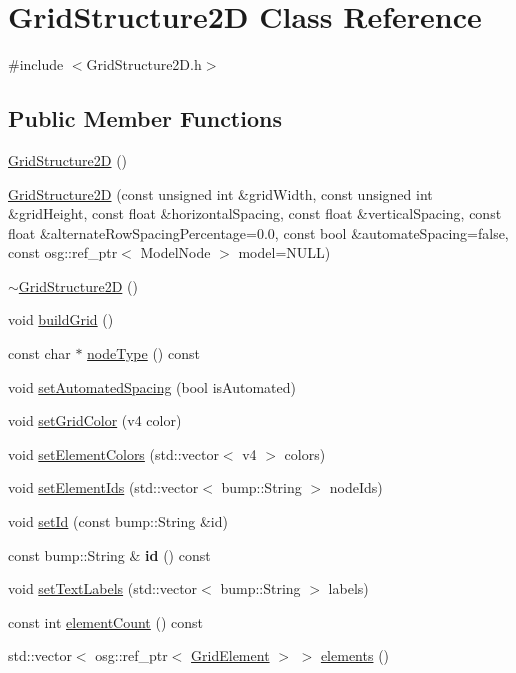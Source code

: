 \hypertarget{class_grid_structure2_d}{
\section{GridStructure2D Class Reference}
\label{class_grid_structure2_d}
}


{\ttfamily \#include $<$GridStructure2D.h$>$}\subsection*{Public Member Functions}
\begin{DoxyCompactItemize}
\item 
\hyperlink{class_grid_structure2_d_ad7665e25b03615d26437a6d2d7a6ab13}{GridStructure2D} ()
\item 
\hyperlink{class_grid_structure2_d_a6e85d262f6e5c6a8be7aad82e4c0eb8b}{GridStructure2D} (const unsigned int \&gridWidth, const unsigned int \&gridHeight, const float \&horizontalSpacing, const float \&verticalSpacing, const float \&alternateRowSpacingPercentage=0.0, const bool \&automateSpacing=false, const osg::ref\_\-ptr$<$ ModelNode $>$ model=NULL)
\item 
\hyperlink{class_grid_structure2_d_a90ac22e05a7e1bf2737d3fa51d158b61}{$\sim$GridStructure2D} ()
\item 
void \hyperlink{class_grid_structure2_d_a35f694a9b0e064bfaebff7c382ba2ecb}{buildGrid} ()
\item 
const char $\ast$ \hyperlink{class_grid_structure2_d_af994372e96543559c040b40bb6969bfa}{nodeType} () const 
\item 
void \hyperlink{class_grid_structure2_d_acbf816d7cb1750c2084c09db385f2db3}{setAutomatedSpacing} (bool isAutomated)
\item 
void \hyperlink{class_grid_structure2_d_a42560f8eba785035b818caa98ac0b638}{setGridColor} (v4 color)
\item 
void \hyperlink{class_grid_structure2_d_a8e7ab4852eb1565ee2853e38d13fecd0}{setElementColors} (std::vector$<$ v4 $>$ colors)
\item 
void \hyperlink{class_grid_structure2_d_a29faefdc28cc26500d55ee8b440d9e14}{setElementIds} (std::vector$<$ bump::String $>$ nodeIds)
\item 
void \hyperlink{class_grid_structure2_d_a88998a17969451df48250f98ad2b406d}{setId} (const bump::String \&id)
\item 
\hypertarget{class_grid_structure2_d_aea20f472b6b5766fd0a6ca5cd08ce557}{
const bump::String \& {\bfseries id} () const }
\label{class_grid_structure2_d_aea20f472b6b5766fd0a6ca5cd08ce557}

\item 
void \hyperlink{class_grid_structure2_d_a59ae6f160f10f31c33f01677c2efaa3b}{setTextLabels} (std::vector$<$ bump::String $>$ labels)
\item 
const int \hyperlink{class_grid_structure2_d_aab843adb6bb6ba3e2b884591ba6738fe}{elementCount} () const 
\item 
std::vector$<$ osg::ref\_\-ptr$<$ \hyperlink{class_grid_element}{GridElement} $>$ $>$ \hyperlink{class_grid_structure2_d_a5faabe450979fc40d520b7237e3be6d7}{elements} ()
\end{DoxyCompactItemize}

